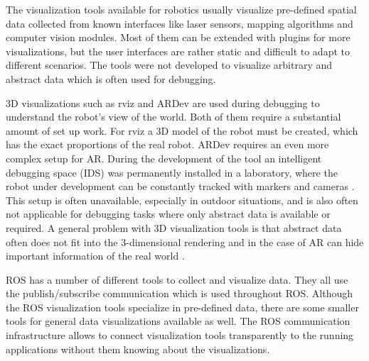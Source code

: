 The visualization tools available for robotics usually visualize pre-defined spatial data collected from known interfaces like laser sensors, mapping algorithms and computer vision modules. Most of them can be extended with plugins for more visualizations, but the user interfaces are rather static and difficult to adapt to different scenarios. The tools were not developed to visualize arbitrary and abstract data which is often used for debugging.

3D visualizations such as rviz and ARDev are used during debugging to understand the robot's view of the world. Both of them require a substantial amount of set up work. For rviz a 3D model of the robot must be created, which has the exact proportions of the real robot. ARDev requires an even more complex setup for AR. During the development of the tool an intelligent debugging space (IDS) was permanently installed in a laboratory, where the robot under development can be constantly tracked with markers and cameras \cite{Collett2010}. This setup is often unavailable, especially in outdoor situations, and is also often not applicable for debugging tasks where only abstract data is available or required. A general problem with 3D visualization tools is that abstract data often does not fit into the 3-dimensional rendering and in the case of AR can hide important information of the real world \cite{Collett2010}.

ROS has a number of different tools to collect and visualize data. They all use the publish/subscribe communication which is used throughout ROS. Although the ROS visualization tools specialize in pre-defined data, there are some smaller tools for general data visualizations available as well. The ROS communication infrastructure allows to connect visualization tools transparently to the running applications without them knowing about the visualizations.

